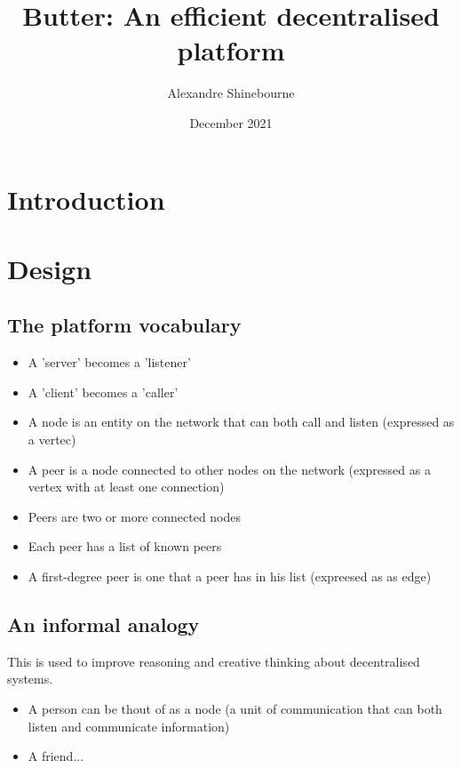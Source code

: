 \documentclass{article}
\title{Butter: An efficient decentralised platform}
\author{Alexandre Shinebourne}
\date{December 2021}
\begin{document}
\maketitle

\section{Introduction}
\section{Design}
\subsection{The platform vocabulary}
\begin{itemize}
    \item A 'server' becomes a 'listener'
    \item A 'client' becomes a 'caller'
    \item A node is an entity on the network that can both call and listen (expressed as a vertec)
    \item A peer is a node connected to other nodes on the network (expressed as a vertex with at least one connection)
    \item Peers are two or more connected nodes
    \item Each peer has a list of known peers
    \item A first-degree peer is one that a peer has in his list (expreesed as as edge)
\end{itemize}
\subsection{An informal analogy}
This is used to improve reasoning and creative thinking about decentralised systems.
\begin{itemize}
    \item A person can be thout of as a node (a unit of communication that can both listen and communicate information)
    \item A friend...
\end{itemize}
\end{document}
